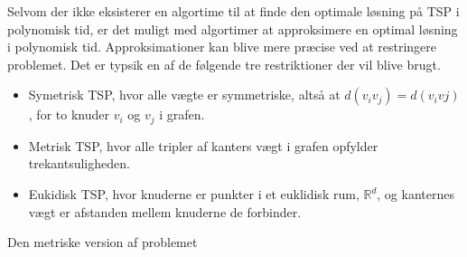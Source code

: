 Selvom der ikke eksisterer en algortime til at finde den optimale løsning på TSP i polynomisk tid, er det muligt med algortimer at approksimere en optimal løsning i polynomisk tid. Approksimationer kan blive mere præcise ved at restringere problemet.
Det er typsik en af de følgende tre restriktioner der vil blive brugt. 
\begin{itemize}
	\item Symetrisk TSP, hvor alle vægte er symmetriske, altså at $d(v_i v_j) = d(v_i vj)$, for to knuder $v_i$ og $v_j$ i grafen.
	\item Metrisk TSP, hvor alle tripler af kanters vægt i grafen opfylder trekantsuligheden.
	\item Eukidisk TSP, hvor knuderne er punkter i et euklidisk rum, ${\mathbb{R}}^d$, og kanternes vægt er afstanden mellem knuderne de forbinder.
\end{itemize}
Den metriske version af problemet 

